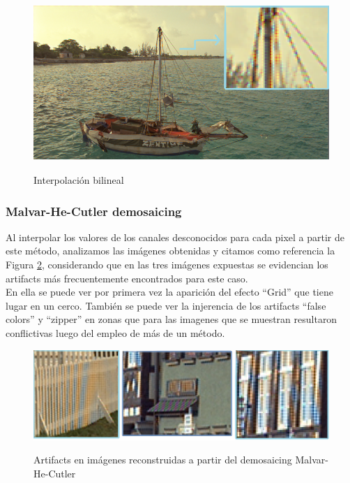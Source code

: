 \documentclass[a4paper]{article}
\begin{document}
\begin{figure}[h!]
	\caption{Interpolación bilineal}
	\begin{center}
	\includegraphics[scale=0.06]{imagenes/barcobilineal}
	\label{barcobilineal}
  \end{center}
\end{figure}

\newpage

\subsubsection{Malvar-He-Cutler demosaicing}

Al interpolar los valores de los canales desconocidos para cada pixel a partir de este método, analizamos las imágenes obtenidas y citamos como referencia la Figura \ref{mhczoom}, considerando que en las tres imágenes expuestas se evidencian los artifacts más frecuentemente encontrados para este caso.\\
En ella se puede ver por primera vez la aparición del efecto ``Grid'' que tiene lugar en un cerco. También se puede ver la injerencia de los artifacts ``false colors'' y ``zipper'' en zonas que para las imagenes que se muestran resultaron conflictivas luego del empleo de más de un método.


\begin{figure}[h!]
	\caption{Artifacts en imágenes reconstruidas a partir del demosaicing Malvar-He-Cutler}
	\begin{center}
	\includegraphics[scale=0.7]{imagenes/mhczoom}
	\label{mhczoom}
  \end{center}
\end{figure}
\end{document}
